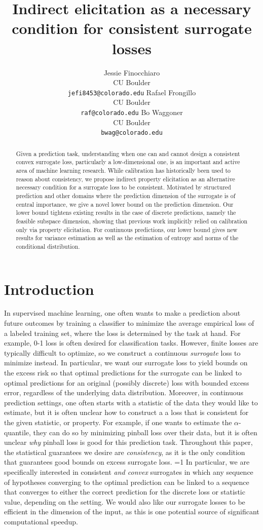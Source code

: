 \documentclass{article}
\title{Indirect elicitation as a necessary condition for consistent surrogate losses}
\author{%
  Jessie Finocchiaro\\
  CU Boulder\\
  \texttt{jefi8453@colorado.edu} 
  \And
   Rafael Frongillo\\
   CU Boulder\\
   \texttt{raf@colorado.edu} 
   \And
   Bo Waggoner\\
   CU Boulder \\
   \texttt{bwag@colorado.edu} 
}
\newcommand{\Comments}{1}
\newcommand{\mytodo}[2]{\ifnum\Comments=1%
	\todo[linecolor=#1!80!black,backgroundcolor=#1,bordercolor=#1!80!black]{#2}\fi}
\newcommand{\jessiet}[1]{\mytodo{purple!20!white}{JF: #1}}
\begin{document}
\maketitle

\begin{abstract}
Given a prediction task, understanding when one can and cannot design a consistent convex surrogate loss, particularly a low-dimensional one, is an important and active area of machine learning research. 
While calibration has historically been used to reason about consistency, we propose indirect property elicitation as an alternative necessary condition for a surrogate loss to be consistent. 
Motivated by structured prediction and other domains where the prediction dimension of the surrogate is of central importance, we give a novel lower bound on the prediction dimension. 
Our lower bound tightens existing results in the case of discrete predictions, namely the feasible subspace dimension, showing that previous work implicitly relied on calibration only via property elicitation. 
For continuous predictions, our lower bound gives new results for variance estimation as well as the estimation of entropy and norms of the conditional distribution.
\end{abstract}

\section{Introduction}\label{sec:intro}
In supervised machine learning, one often wants to make a prediction about future outcomes by training a classifier to minimize the average empirical loss of a labeled training set, where the loss is determined by the task at hand.
For example, 0-1 loss is often desired for classification tasks.
However, finite losses are typically difficult to optimize, so we construct a continuous \emph{surrogate} loss to minimize instead.
In particular, we want our surrogate loss to yield bounds on the excess risk so that optimal predictions for the surrogate can be linked to optimal predictions for an original (possibly discrete) loss with bounded excess error, regardless of the underlying data distribution.
Moreover, in continuous prediction settings, one often starts with a statistic of the data they would like to estimate, but it is often unclear how to construct a a loss that is consistent for the given statistic, or property.
For example, if one wants to estimate the $\alpha$-quantile, they can do so by minimizing pinball loss over their data, but it is often unclear \emph{why} pinball loss is good for this prediction task.
Throughout this paper, the statistical guarantees we desire are \emph{consistency}, as it is the only condition that guarantees good bounds on excess surrogate loss. \jessiet{Raf, maybe fill in here with ERM bounds?}
In particular, we are specifically interested in consistent \emph{and convex} surrogates in which any sequence of hypotheses converging to the optimal prediction can be linked to a sequence that converges to either the correct prediction for the discrete loss or statistic value, depending on the setting. 
We would also like our surrogate losses to be efficient in the dimension of the input, as this is one potential source of significant computational speedup.
\end{document}
